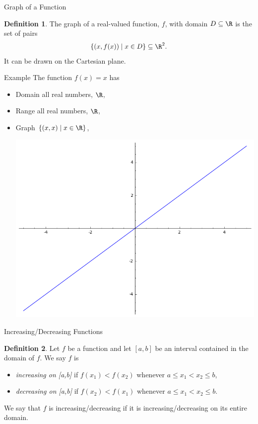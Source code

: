 \documentclass{beamer}
\theoremstyle{definition}
\newtheorem{defn}{Definition}
\begin{document}
\begin{frame}{Graph of a Function}
  \begin{defn}
    The graph of a real-valued function, $f$, with domain $D \subseteq \R$ is the set of pairs
    $$\left\{(x, f(x)) \;\middle\vert\; x \in D\right\} \subseteq \R^2.$$
    It can be drawn on the Cartesian plane.
  \end{defn}
\end{frame}

\begin{frame}{Example}
  The function $f(x) = x$ has 
  \begin{itemize}
    \item<2->
      Domain all real numbers, $\R$,
    \item<3->
      Range all real numbers, $\R$,
    \item<4->
      Graph $\left\{(x,x) \;\middle\vert\; x \in \R\right\}$,
      \begin{center}
        \includegraphics[scale=0.25]{imgs/idGraph.png}
      \end{center}
  \end{itemize}
\end{frame}


\begin{frame}{Increasing/Decreasing Functions}
  \begin{defn}
    Let $f$ be a function and let $[a,b]$ be an interval contained in the domain of $f$.
    We say $f$ is
    \begin{itemize}
      \item<2->
        {\it increasing on [a,b]} if $f(x_1) < f(x_2)$ whenever $a \leq x_1 < x_2 \leq b$,
      \item<3->
        {\it decreasing on [a,b]} if $f(x_2) < f(x_1)$ whenever $a \leq x_1 < x_2 \leq b$.
    \end{itemize}
    We say that $f$ is increasing/decreasing if it is increasing/decreasing on its entire domain.
  \end{defn}
\end{frame}
\end{document}
